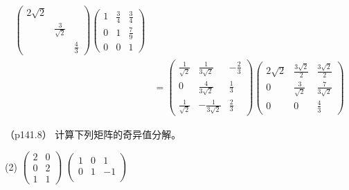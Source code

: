 \documentclass[12pt, a4paper, oneside, UTF8]{ctexbook}
\begin{document}
\begin{solution}
\begin{enumerate}[label=(\arabic*)]
\begin{align*}
\begin{pmatrix}
                2\sqrt{2} & & \\
                & \frac{3}{\sqrt{2}}& \\
                & & \frac{4}{3}
            \end{pmatrix}
            \begin{pmatrix}
                1 &\frac{3}{4}&\frac{3}{4}\\
                0 & 1&\frac{7}{9} \\
                0&0&1
            \end{pmatrix}\\
            &=\begin{pmatrix}
                \frac{1}{\sqrt{2}}& \frac{1}{3\sqrt{2}} & -\frac{2}{3}\\
                0& \frac{4}{3\sqrt{2}}& \frac{1}{3} \\
                \frac{1}{\sqrt{2}} & -\frac{1}{3\sqrt{2}}& \frac{2}{3}
            \end{pmatrix}
            \begin{pmatrix}
                2\sqrt{2} &\frac{3\sqrt{2}}{2}&\frac{3\sqrt{2}}{2}\\
                0 & \frac{3}{\sqrt{2}}&\frac{7}{3\sqrt{2}} \\
                0&0&\frac{4}{3}
            \end{pmatrix}
        \end{align*}
    \end{enumerate}
\end{solution}


\begin{question}（p141.8）
    计算下列矩阵的奇异值分解。
    \begin{tasks}[label=(\arabic*)](2)
        \task $\begin{pmatrix}
            2&0\\
            0&2\\
            1&1
        \end{pmatrix}$
        \task $\begin{pmatrix}
            1&0&1\\
            0&1&-1\\
        \end{pmatrix}$
    \end{tasks}
\end{question}
\end{document}
